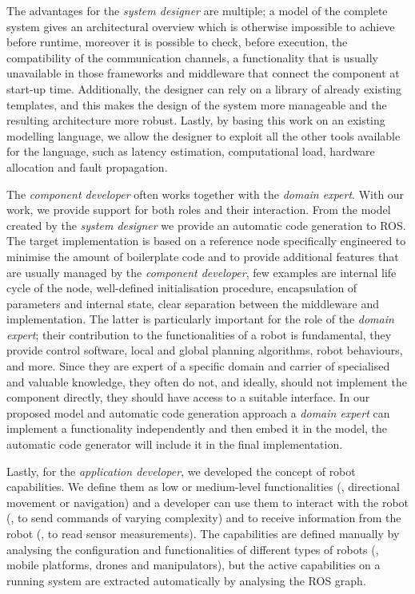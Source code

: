 The advantages for the \textit{system designer} are multiple; a model of the complete system gives an architectural overview which is otherwise impossible to achieve before runtime, moreover it is possible to check, before execution, the compatibility of the communication channels, a functionality that is usually unavailable in those frameworks and middleware that connect the component at start-up time. Additionally, the designer can rely on a library of already existing templates, and this makes the design of the system more manageable and the resulting architecture more robust. Lastly, by basing this work on an existing modelling language, we allow the designer to exploit all the other tools available for the language, such as latency estimation, computational load, hardware allocation and fault propagation.

The \textit{component developer} often works together with the \textit{domain expert}. With our work, we provide support for both roles and their interaction. From the model created by the \textit{system designer} we provide an automatic code generation to ROS. The target implementation is based on a reference node specifically engineered to minimise the amount of boilerplate code and to provide additional features that are usually managed by the \textit{component developer}, few examples are internal life cycle of the node, well-defined initialisation procedure, encapsulation of parameters and internal state, clear separation between the middleware and implementation. The latter is particularly important for the role of the \textit{domain expert}; their contribution to the functionalities of a robot is fundamental, they provide control software, local and global planning algorithms, robot behaviours, and more. Since they are expert of a specific domain and carrier of specialised and valuable knowledge, they often do not, and ideally, should not implement the component directly, they should have access to a suitable interface. In our proposed model and automatic code generation approach a \textit{domain expert} can implement a functionality independently and then embed it in the model, the automatic code generator will include it in the final implementation.

Lastly, for the \textit{application developer}, we developed the concept of robot capabilities. We define them as low or medium-level functionalities (\eg, directional movement or navigation) and a developer can use them to interact with the robot (\ie, to send commands of varying complexity) and to receive information from the robot (\ie, to read sensor measurements). The capabilities are defined manually by analysing the configuration and functionalities of different types of robots (\ie, mobile platforms, drones and manipulators), but the active capabilities on a running system are extracted automatically by analysing the ROS graph.

